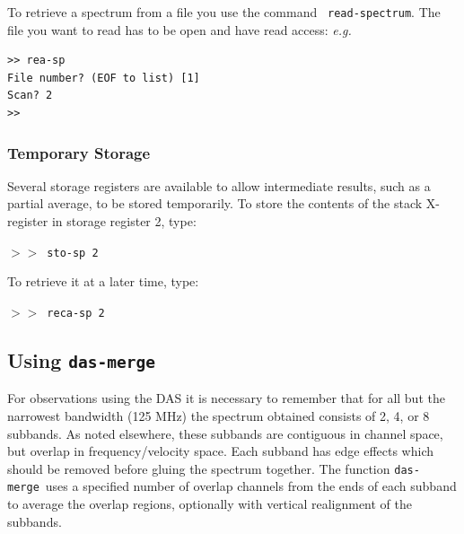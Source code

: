 \documentclass[11pt,twoside]{article}
\newcommand{\eg}{{\it e.g.}}
\newcommand{\dm}{{\tt das-merge}}
\newcommand{\SP}{{$>\!>$}}
\begin{document}
To retrieve a spectrum from a file you use the command {\tt
read-spectrum}.  The file you want to read has to be open and have
read access: \eg

\begin{verbatim}
>> rea-sp
File number? (EOF to list) [1]
Scan? 2
>>
\end{verbatim}

\subsubsection{Temporary Storage}
\label{sec:temp-storage}
Several storage registers are available to allow intermediate results,
such as a partial average, to be stored temporarily. To store the
contents of the stack X-register in storage register 2, type:

\SP\ {\tt sto-sp 2}

To retrieve it at a later time, type:

\SP\ {\tt reca-sp 2}


\subsection{Using {\tt das-merge}}
\label{sec:das-merge}
For observations using the DAS it is necessary to remember that for
all but the narrowest bandwidth (125 MHz) the spectrum obtained
consists of 2, 4, or 8 subbands. As noted elsewhere, these subbands
are contiguous in channel space, but overlap in frequency/velocity
space. Each subband has edge effects which should be removed before
gluing the spectrum together. The function \dm\ uses a specified
number of overlap channels from the ends of each subband to average
the overlap regions, optionally with vertical realignment of the
subbands.
\end{document}
